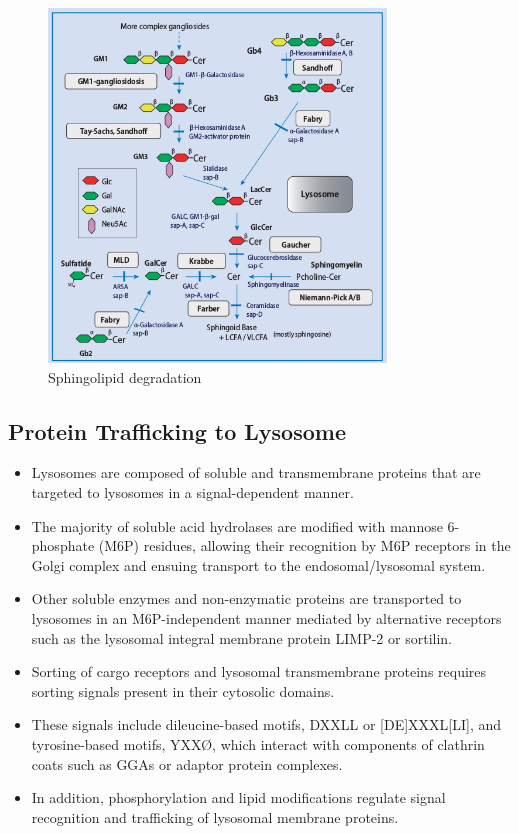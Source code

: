 \documentclass{scrartcl}
\begin{document}
\begin{figure}[htbp]
\centering
\includegraphics[width=0.8\textwidth]{./figures/sl_degradation.png}
\caption{\label{fig:org0dd5ea2}
Sphingolipid degradation}
\end{figure}

\subsection{Protein Trafficking to Lysosome}
\label{sec:org989c14b}
\begin{itemize}
\item Lysosomes are composed of soluble and transmembrane proteins that
are targeted to lysosomes in a signal-dependent manner.
\item The majority of soluble acid hydrolases are modified with mannose
6-phosphate (M6P) residues, allowing their recognition by M6P
receptors in the Golgi complex and ensuing transport to the
endosomal/lysosomal system.
\item Other soluble enzymes and non-enzymatic proteins are transported to
lysosomes in an M6P-independent manner mediated by alternative
receptors such as the lysosomal integral membrane protein LIMP-2 or
sortilin.
\item Sorting of cargo receptors and lysosomal transmembrane proteins
requires sorting signals present in their cytosolic domains.
\item These signals include dileucine-based motifs, DXXLL or [DE]XXXL[LI],
and tyrosine-based motifs, YXXØ, which interact with components of
clathrin coats such as GGAs or adaptor protein complexes.
\item In addition, phosphorylation and lipid modifications regulate signal
recognition and trafficking of lysosomal membrane proteins.
\end{itemize}
\end{document}
